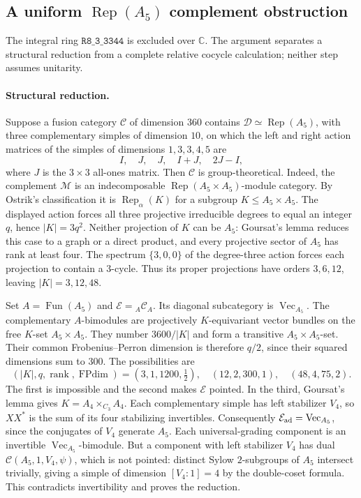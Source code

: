 \subsection{A uniform $\operatorname{Rep}(A_5)$ complement obstruction}
\label{sec:rank8-a5-complement}

The integral ring $\mathtt{R8\_3\_3344}$ is excluded over $\mathbb C$.
The argument separates a structural reduction from a complete relative
cocycle calculation; neither step assumes unitarity.

\paragraph{Structural reduction.}
Suppose a fusion category $\mathcal C$ of dimension $360$ contains
$\mathcal D\simeq\operatorname{Rep}(A_5)$, with three complementary
simples of dimension $10$, on which the left and right action matrices
of the simples of dimensions $1,3,3,4,5$ are
\[
 I,\quad J,\quad J,\quad I+J,\quad 2J-I,
\]
where $J$ is the $3\times3$ all-ones matrix. Then $\mathcal C$ is
group-theoretical.
Indeed, the complement $\mathcal M$ is an indecomposable
$\operatorname{Rep}(A_5\times A_5)$-module category. By Ostrik's
classification it is $\operatorname{Rep}_{\alpha}(K)$ for a subgroup
$K\leq A_5\times A_5$. The displayed action forces all three projective
irreducible degrees to equal an integer $q$, hence $|K|=3q^2$.
Neither projection of $K$ can be $A_5$: Goursat's lemma reduces this
case to a graph or a direct product, and every projective sector of
$A_5$ has rank at least four. The spectrum $\{3,0,0\}$ of the degree-three
action forces each projection to contain a $3$-cycle. Thus its proper
projections have orders $3,6,12$, leaving $|K|=3,12,48$.

Set $A=\operatorname{Fun}(A_5)$ and
$\mathcal E={}_A\mathcal C_A$. Its diagonal subcategory is
$\operatorname{Vec}_{A_5}$. The complementary $A$-bimodules are
projectively $K$-equivariant vector bundles on the free $K$-set
$A_5\times A_5$. They number $3600/|K|$ and form a transitive
$A_5\times A_5$-set. Their common Frobenius--Perron dimension is therefore
$q/2$, since their squared dimensions sum to $300$.
The possibilities are
\[
 (|K|,q,\operatorname{rank},\operatorname{FPdim})
 =(3,1,1200,\tfrac12),\quad(12,2,300,1),\quad(48,4,75,2).
\]
The first is impossible and the second makes $\mathcal E$ pointed.
In the third, Goursat's lemma gives
$K=A_4\times_{C_3}A_4$. Each complementary simple has left stabilizer
$V_4$, so $XX^*$ is the sum of its four stabilizing invertibles.
Consequently $\mathcal E_{\rm ad}=\operatorname{Vec}_{A_5}$, since the
conjugates of $V_4$ generate $A_5$.
Each universal-grading component is an invertible
$\operatorname{Vec}_{A_5}$-bimodule. But a component with left stabilizer
$V_4$ has dual $\mathcal C(A_5,1,V_4,\psi)$, which is not pointed:
distinct Sylow $2$-subgroups of $A_5$ intersect trivially, giving a
simple of dimension $[V_4:1]=4$ by the double-coset formula.
This contradicts invertibility and proves the reduction.

